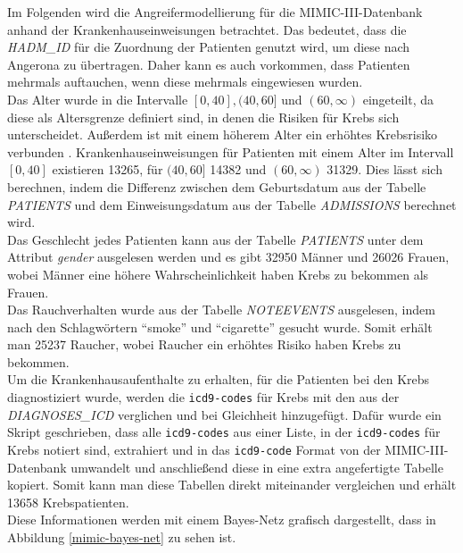 \documentclass[german,version-2020-11]{uzl-thesis}
\begin{document}
Im Folgenden wird die Angreifermodellierung für die MIMIC-III-Datenbank anhand der Krankenhauseinweisungen betrachtet. Das bedeutet, dass die \textit{HADM\_ID} für die Zuordnung der Patienten genutzt wird, um diese nach Angerona zu übertragen. Daher kann es auch vorkommen, dass Patienten mehrmals auftauchen, wenn diese mehrmals eingewiesen wurden.\\ 
Das Alter wurde in die Intervalle $[0,40], (40,60]$ und $(60,\infty)$ eingeteilt, da diese als Altersgrenze definiert sind, in denen die Risiken für Krebs sich unterscheidet. Außerdem ist mit einem höherem Alter ein erhöhtes Krebsrisiko verbunden \cite{13}. Krankenhauseinweisungen für Patienten mit einem Alter im Intervall $[0,40]$ existieren 13265, für $(40,60]$ 14382 und $(60,\infty)$ 31329. Dies lässt sich berechnen, indem die Differenz zwischen dem Geburtsdatum aus der Tabelle \textit{PATIENTS} und dem Einweisungsdatum aus der Tabelle \textit{ADMISSIONS} berechnet wird.\\
Das Geschlecht jedes Patienten kann aus der Tabelle \textit{PATIENTS} unter dem Attribut \textit{gender} ausgelesen werden und es gibt 32950 Männer und 26026 Frauen, wobei Männer eine höhere Wahrscheinlichkeit haben Krebs zu bekommen als Frauen. \\
Das Rauchverhalten wurde aus der Tabelle \textit{NOTEEVENTS} ausgelesen, indem nach den Schlagwörtern \enquote{smoke} und \enquote{cigarette} gesucht wurde. Somit erhält man 25237 Raucher, wobei Raucher ein erhöhtes Risiko haben Krebs zu bekommen. \\
Um die Krankenhausaufenthalte zu erhalten, für die Patienten bei den  Krebs diagnostiziert wurde, werden die \texttt{icd9-codes} für Krebs \cite{16} mit den aus der \textit{DIAGNOSES\_ICD} verglichen und bei Gleichheit hinzugefügt. Dafür wurde ein Skript geschrieben, dass alle \texttt{icd9-codes} aus einer Liste, in der \texttt{icd9-codes} für Krebs notiert sind, extrahiert und in  das \texttt{icd9-code} Format von der MIMIC-III-Datenbank umwandelt und anschließend diese in eine extra angefertigte Tabelle kopiert. Somit kann man diese Tabellen direkt miteinander vergleichen und erhält 13658 Krebspatienten. \\ 
Diese Informationen werden mit einem Bayes-Netz grafisch dargestellt, dass in Abbildung \ref{mimic-bayes-net} zu sehen ist.\\
\end{document}

